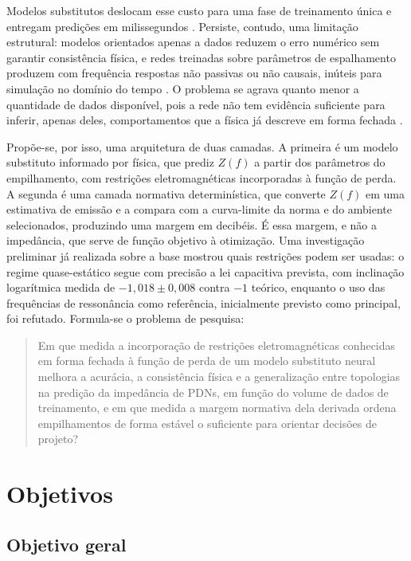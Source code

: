 Modelos substitutos deslocam esse custo para uma fase de treinamento única e
entregam predições em milissegundos \citep{swaminathan2020,jiang2020,zhang2021}.
Persiste, contudo, uma limitação estrutural: modelos orientados apenas a dados
reduzem o erro numérico sem garantir consistência física, e redes treinadas sobre
parâmetros de espalhamento produzem com frequência respostas não passivas ou não
causais, inúteis para simulação no domínio do tempo \citep{torun2020}. O problema se
agrava quanto menor a quantidade de dados disponível, pois a rede não tem evidência
suficiente para inferir, apenas deles, comportamentos que a física já descreve em
forma fechada \citep{raissi2019}.

Propõe-se, por isso, uma arquitetura de duas camadas. A primeira é um modelo
substituto informado por física, que prediz $Z(f)$ a partir dos parâmetros do
empilhamento, com restrições eletromagnéticas incorporadas à função de perda. A
segunda é uma camada normativa determinística, que converte $Z(f)$ em uma
estimativa de emissão e a compara com a curva-limite da norma e do ambiente
selecionados, produzindo uma margem em decibéis. É essa margem, e não a impedância,
que serve de função objetivo à otimização. Uma investigação preliminar já realizada
sobre a base mostrou quais restrições podem ser usadas: o regime quase-estático
segue com precisão a lei capacitiva prevista, com inclinação logarítmica medida de
$-1{,}018 \pm 0{,}008$ contra $-1$ teórico, enquanto o uso das frequências de
ressonância como referência, inicialmente previsto como principal, foi refutado.
Formula-se o problema de pesquisa:

\begin{quote}
Em que medida a incorporação de restrições eletromagnéticas conhecidas em forma
fechada à função de perda de um modelo substituto neural melhora a acurácia, a
consistência física e a generalização entre topologias na predição da impedância de
PDNs, em função do volume de dados de treinamento, e em que medida a margem
normativa dela derivada ordena empilhamentos de forma estável o suficiente para
orientar decisões de projeto?
\end{quote}

\section{Objetivos}
\label{sec:objetivos}

\subsection{Objetivo geral}

